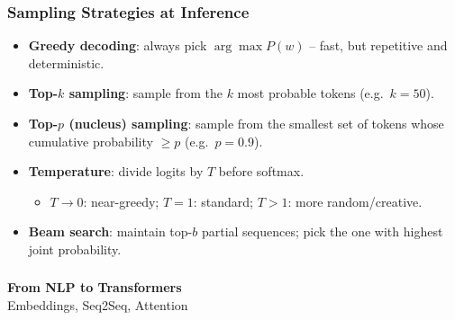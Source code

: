 \begin{frame}[fragile]\frametitle{Sampling Strategies at Inference}
\begin{itemize}
\item \textbf{Greedy decoding}: always pick $\arg\max P(w)$ – fast, but repetitive and deterministic.
\item \textbf{Top-$k$ sampling}: sample from the $k$ most probable tokens (e.g.\ $k=50$).
\item \textbf{Top-$p$ (nucleus) sampling}: sample from the smallest set of tokens whose cumulative probability $\ge p$ (e.g.\ $p=0.9$).
\item \textbf{Temperature}: divide logits by $T$ before softmax.
  \begin{itemize}
  \item $T \to 0$: near-greedy; $T=1$: standard; $T > 1$: more random/creative.
  \end{itemize}
\item \textbf{Beam search}: maintain top-$b$ partial sequences; pick the one with highest joint probability.
\end{itemize}
\end{frame}


\begin{frame}[fragile]\frametitle{}
\begin{center}
{\Large \textbf{From NLP to Transformers}}\\[0.5em]
{\normalsize Embeddings, Seq2Seq, Attention}
\end{center}
\end{frame}

